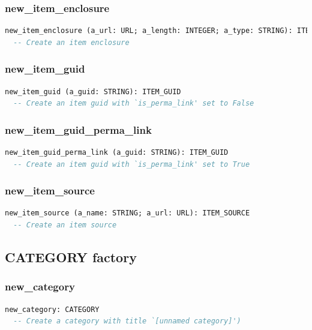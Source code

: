 \subsubsection{new\_item\_enclosure}

\begin{lstlisting}[language=Eiffel]
new_item_enclosure (a_url: URL; a_length: INTEGER; a_type: STRING): ITEM_ENCLOSURE
  -- Create an item enclosure
\end{lstlisting}


\subsubsection{new\_item\_guid}

\begin{lstlisting}[language=Eiffel]
new_item_guid (a_guid: STRING): ITEM_GUID
  -- Create an item guid with `is_perma_link' set to False
\end{lstlisting}


\subsubsection{new\_item\_guid\_perma\_link}

\begin{lstlisting}[language=Eiffel]
new_item_guid_perma_link (a_guid: STRING): ITEM_GUID
  -- Create an item guid with `is_perma_link' set to True
\end{lstlisting}


\subsubsection{new\_item\_source}

\begin{lstlisting}[language=Eiffel]
new_item_source (a_name: STRING; a_url: URL): ITEM_SOURCE
  -- Create an item source
\end{lstlisting}


\subsection{CATEGORY factory}
\label{sec:syndication-factory-category}

\subsubsection{new\_category}

\begin{lstlisting}[language=Eiffel]
new_category: CATEGORY
  -- Create a category with title `[unnamed category]')
\end{lstlisting}


